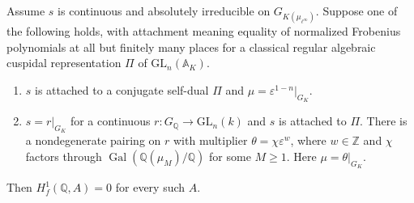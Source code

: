 \begin{proposition}\label{newgal:adselmer}
Assume $s$ is continuous and absolutely irreducible on
$G_{K(\mu_{\ell^\infty})}$. Suppose one of the following holds, with
attachment meaning equality of normalized Frobenius polynomials at all
but finitely many places for a classical regular algebraic cuspidal
representation $\Pi$ of $\mathrm{GL}_n(\mathbb A_K)$.
\begin{enumerate}
\item $s$ is attached to a conjugate self-dual $\Pi$ and
$\mu=\varepsilon^{1-n}|_{G_K}$.
\item $s=r|_{G_K}$ for a continuous $r:G_{\mathbb Q}\to\mathrm{GL}_n(k)$
and $s$ is attached to $\Pi$. There is a nondegenerate pairing on $r$
with multiplier $\theta=\chi\varepsilon^w$, where $w\in\mathbb Z$ and
$\chi$ factors through $\operatorname{Gal}(\mathbb Q(\mu_M)/\mathbb Q)$
for some $M\ge1$. Here $\mu=\theta|_{G_K}$.
\end{enumerate}
Then $H^1_f(\mathbb Q,A)=0$ for every such $A$.
\end{proposition}
